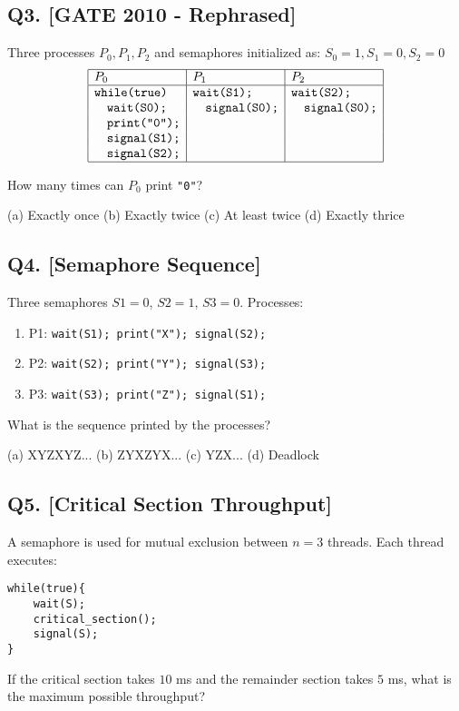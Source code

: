 \subsection*{Q3. [GATE 2010 - Rephrased]}
Three processes \(P_0, P_1, P_2\) and semaphores initialized as: \(S_0 = 1, S_1 = 0, S_2 = 0\)
\[
\begin{array}{|l|l|l|}
\hline
P_0 & P_1 & P_2 \\
\hline
\texttt{while(true)} & \texttt{wait(S1);} & \texttt{wait(S2);} \\
\quad \texttt{wait(S0);} & \quad \texttt{signal(S0);} & \quad \texttt{signal(S0);} \\
\quad \texttt{print("0");} & & \\
\quad \texttt{signal(S1);} & & \\
\quad \texttt{signal(S2);} & & \\
\hline
\end{array}
\]

How many times can \(P_0\) print \texttt{"0"}?

(a) Exactly once \quad
(b) Exactly twice \quad
(c) At least twice \quad
(d) Exactly thrice

\vspace{1em}

\subsection*{Q4. [Semaphore Sequence]}
Three semaphores \(S1 = 0\), \(S2 = 1\), \(S3 = 0\). Processes:

\begin{enumerate}[label=-]
    \item P1: \texttt{wait(S1); print("X"); signal(S2);}
    \item P2: \texttt{wait(S2); print("Y"); signal(S3);}
    \item P3: \texttt{wait(S3); print("Z"); signal(S1);}
\end{enumerate}


What is the sequence printed by the processes?

(a) XYZXYZ... \quad
(b) ZYXZYX... \quad
(c) YZX... \quad
(d) Deadlock

\vspace{1em}

\subsection*{Q5. [Critical Section Throughput]}
A semaphore is used for mutual exclusion between $n=3$ threads. Each thread executes:
\begin{verbatim}
while(true){
    wait(S);
    critical_section();
    signal(S);
}
\end{verbatim}
If the critical section takes $10$ ms and the remainder section takes $5$ ms, what is the maximum possible throughput?


